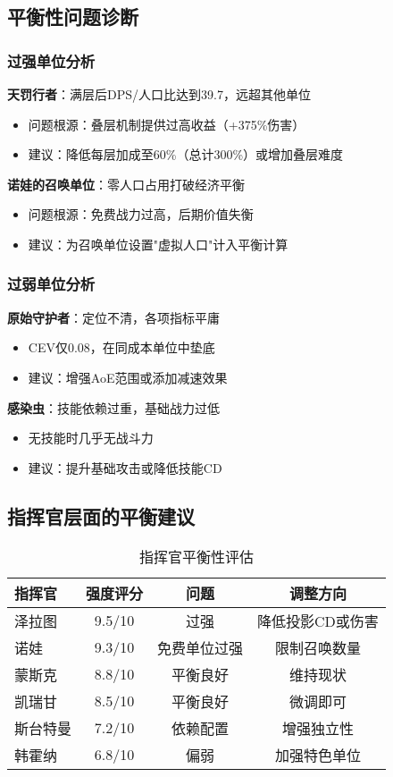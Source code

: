 \documentclass[a4paper,12pt]{article}
\begin{document}
\subsection{平衡性问题诊断}

\subsubsection{过强单位分析}
\textbf{天罚行者}：满层后DPS/人口比达到39.7，远超其他单位
\begin{itemize}
\item 问题根源：叠层机制提供过高收益（+375\%伤害）
\item 建议：降低每层加成至60\%（总计300\%）或增加叠层难度
\end{itemize}

\textbf{诺娃的召唤单位}：零人口占用打破经济平衡
\begin{itemize}
\item 问题根源：免费战力过高，后期价值失衡
\item 建议：为召唤单位设置"虚拟人口"计入平衡计算
\end{itemize}

\subsubsection{过弱单位分析}
\textbf{原始守护者}：定位不清，各项指标平庸
\begin{itemize}
\item CEV仅0.08，在同成本单位中垫底
\item 建议：增强AoE范围或添加减速效果
\end{itemize}

\textbf{感染虫}：技能依赖过重，基础战力过低
\begin{itemize}
\item 无技能时几乎无战斗力
\item 建议：提升基础攻击或降低技能CD
\end{itemize}

\subsection{指挥官层面的平衡建议}

\begin{table}[h]
\centering
\caption{指挥官平衡性评估}
\begin{tabular}{lccc}
\toprule
\textbf{指挥官} & \textbf{强度评分} & \textbf{问题} & \textbf{调整方向} \\
\midrule
泽拉图 & 9.5/10 & 过强 & 降低投影CD或伤害 \\
诺娃 & 9.3/10 & 免费单位过强 & 限制召唤数量 \\
蒙斯克 & 8.8/10 & 平衡良好 & 维持现状 \\
凯瑞甘 & 8.5/10 & 平衡良好 & 微调即可 \\
斯台特曼 & 7.2/10 & 依赖配置 & 增强独立性 \\
韩霍纳 & 6.8/10 & 偏弱 & 加强特色单位 \\
\bottomrule
\end{tabular}
\end{table}
\end{document}
